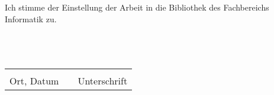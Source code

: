 Ich stimme der Einstellung der Arbeit in die Bibliothek des Fachbereichs Informatik zu.
\\
\\
\\
\\
\begin{tabular}{lp{2em}l}
 \hspace{5cm}   && \hspace{5cm} \\
 \cline{1-1}\cline{3-3}
 Ort, Datum     && Unterschrift
\end{tabular}